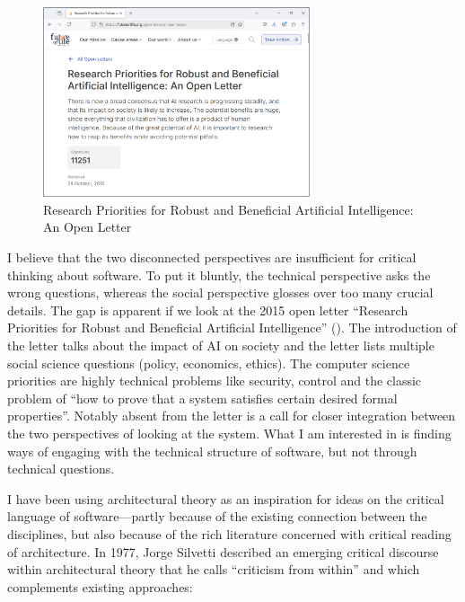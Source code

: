\begin{figure}
\centering
\vspace{-1em}
\includegraphics[width=0.7\textwidth]{fig/ai.png}
\caption{Research Priorities for Robust and Beneficial Artificial Intelligence: An Open Letter}
\label{fig:ai}
\end{figure}

I believe that the two disconnected perspectives are insufficient for critical thinking about
software. To put it bluntly, the technical perspective asks the wrong questions, whereas the social
perspective glosses over too many crucial details. The gap is apparent if we look at the
2015 open letter ``Research Priorities for Robust and Beneficial Artificial
Intelligence'' (). The introduction of the letter talks
about the impact of AI on society and the letter lists multiple social science questions (policy,
economics, ethics). The computer science priorities are highly technical problems like security,
control and the classic problem of ``how to prove that a system satisfies certain desired formal
properties''. Notably absent from the letter is a call for closer integration between the
two perspectives of looking at the system. What I am interested in is finding ways
of engaging with the technical structure of software, but not through technical questions.

I have been using architectural theory as an inspiration for ideas on the critical language
of software---partly because of the existing connection between the disciplines, but also
because of the rich literature concerned with critical reading of architecture.
In 1977, Jorge Silvetti described an emerging critical discourse within architectural theory that
he calls ``criticism from within'' and which complements existing
approaches:

